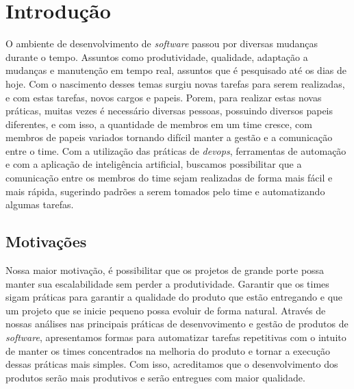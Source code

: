 \chapter{Introdução}
O ambiente de desenvolvimento de \textit{software} passou por diversas mudanças
durante o tempo. Assuntos como produtividade, qualidade, adaptação a mudanças e
manutenção em tempo real, assuntos que é pesquisado até os dias de hoje. \newline
Com o nascimento desses temas surgiu novas tarefas para serem realizadas, e
com estas tarefas, novos cargos e papeis. Porem, para realizar estas novas
práticas, muitas vezes é necessário diversas pessoas, possuindo diversos papeis
diferentes, e com isso, a quantidade de membros em um time cresce, com membros
de papeis variados tornando difícil manter a gestão e a comunicação entre o
time.  \newline
Com a utilização das práticas de \textit{devops}, ferramentas de automação e com
a aplicação de inteligência artificial, buscamos possibilitar que a comunicação
entre os membros do time sejam realizadas de forma mais fácil e mais rápida,
sugerindo padrões a serem tomados pelo time e automatizando algumas tarefas. \newline

\section{Motivações}
Nossa maior motivação, é possibilitar que os projetos de grande porte possa
manter sua escalabilidade sem perder a produtividade. Garantir que os times
sigam práticas para garantir a qualidade do produto que estão entregando e que
um projeto que se inicie pequeno possa evoluir de forma natural.  \newline
Através de nossas análises nas principais práticas de desenvovimento e gestão
de produtos de \textit{software}, apresentamos formas para automatizar tarefas
repetitivas com o intuito de manter os times concentrados na melhoria do produto
e tornar a execução dessas práticas mais simples. Com isso, acreditamos que
o desenvolvimento dos produtos serão mais produtivos e serão entregues com maior
qualidade. \newline
